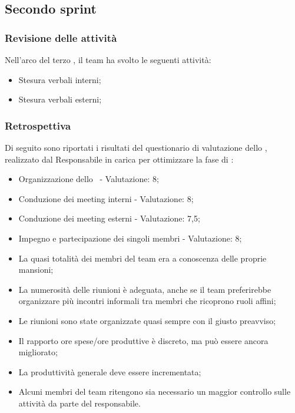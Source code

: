 \subsection{Secondo sprint}

\subsubsection{Revisione delle attività}

Nell'arco del terzo , il team ha svolto le seguenti attività:
\begin{itemize}
    \item Stesura verbali interni;
    \item Stesura verbali esterni;
\end{itemize}

\subsubsection{Retrospettiva}

\par Di seguito sono riportati i risultati del questionario di valutazione dello , realizzato dal Responsabile in carica per ottimizzare la fase di :
\begin{itemize}
  \item Organizzazione dello \ - Valutazione: 8;
  \item Conduzione dei meeting interni - Valutazione: 8;
  \item Conduzione dei meeting esterni - Valutazione: 7,5;
  \item Impegno e partecipazione dei singoli membri - Valutazione: 8;
  \item La quasi totalità dei membri del team era a conoscenza delle proprie mansioni;
  \item La numerosità delle riunioni è adeguata, anche se il team preferirebbe organizzare più incontri informali tra membri che ricoprono ruoli affini;
  \item Le riunioni sono state organizzate quasi sempre con il giusto preavviso;
  \item Il rapporto ore spese/ore produttive è discreto, ma può essere ancora migliorato;
  \item La produttività generale deve essere incrementata;
  \item Alcuni membri del team ritengono sia necessario un maggior controllo sulle attività da parte del responsabile.
\end{itemize}

